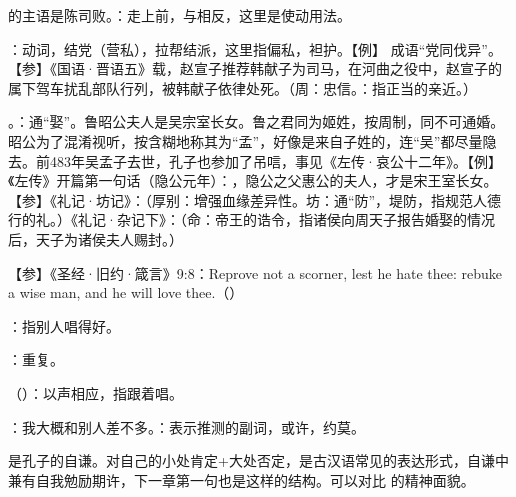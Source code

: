 {\begin{lyitemize}
\item {}的主语是陈司败。：走上前，与相反，这里是使动用法。

\item {}：动词，结党（营私），拉帮结派，这里指偏私，袒护。【例】 成语“党同伐异”。【参】《国语·晋语五》载，赵宣子推荐韩献子为司马，在河曲之役中，赵宣子的属下驾车扰乱部队行列，被韩献子依律处死。（周：忠信。：指正当的亲近。）

\item {}。：通“娶”。鲁昭公夫人是吴宗室长女。鲁之君同为姬姓，按周制，同不可通婚。昭公为了混淆视听，按含糊地称其为“孟”，好像是来自子姓的，连“吴”都尽量隐去。前483年吴孟子去世，孔子也参加了吊唁，事见《左传·哀公十二年》。【例】《左传》开篇第一句话（隐公元年）：，隐公之父惠公的夫人，才是宋王室长女。【参】《礼记·坊记》：（厚别：增强血缘差异性。坊：通“防”，堤防，指规范人德行的礼。）《礼记·杂记下》：（命：帝王的诰令，指诸侯向周天子报告婚娶的情况后，天子为诸侯夫人赐封。）
\end{lyitemize}
【参】《圣经·旧约·箴言》9:8：Reprove not a scorner, lest he hate thee: rebuke a wise man, and he will love thee.（）
}
{}


{
\item {}：指别人唱得好。
\item {}：重复。
\item {}（）：以声相应，指跟着唱。
}
{}


{
\item {}：我大概和别人差不多。：表示推测的副词，或许，约莫。
\item {}是孔子的自谦。对自己的小处肯定+大处否定，是古汉语常见的表达形式，自谦中兼有自我勉励期许，下一章第一句也是这样的结构。可以对比  的精神面貌。
}
{}


